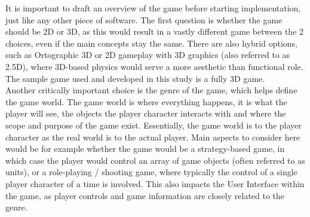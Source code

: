 It is important to draft an overview of the game before starting implementation, just like any other piece of software. The first question is whether the game should be 2D or 3D, as this would result in a vastly different game between the 2 choices, even if the main concepts stay the same. There are also hybrid options, such as Ortographic 3D or 2D gameplay with 3D graphics (also referred to as 2.5D), where 3D-based physics would serve a more aesthetic than functional role. The sample game used and developed in this study is a fully 3D game.\\
Another critically important choice is the genre of the game, which helps define the game world. The game world is where everything happens, it is what the player will see, the objects the player character interacts with and where the scope and purpose of the game exist. Essentially, the game world is to the player character as the real world is to the actual player. Main aspects to consider here would be for example whether the game would be a strategy-based game, in which case the player would control an array of game objects (often referred to as units), or a role-playing / shooting game, where typically the control of a single player character of a time is involved. This also impacts the User Interface within the game, as player controls and game information are closely related to the genre. \\ \\
